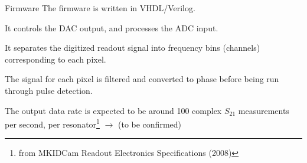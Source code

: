 \documentclass[ignorenonframetext,12pt]{beamer}
\begin{document}

\begin{frame}{Firmware}
				The firmware is written in VHDL/Verilog. 

				It controls the DAC output, and processes the ADC input. 

				It separates the digitized readout signal into frequency bins (channels)
				corresponding to each pixel. 

				The signal for each pixel is filtered and converted to phase before
				being run through \alert{pulse detection}.

				The output data rate is expected to be around 100 complex $S_{21}$
				measurements per second, per resonator\footnote{\tiny{from
				MKIDCam Readout Electronics Specifications (2008)}} $\to$ (\alert{to be
				confirmed})
\end{frame}
\end{document}
